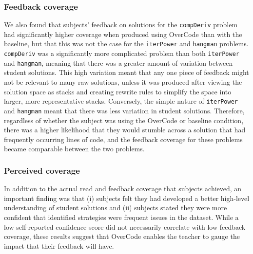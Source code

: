 \documentclass[12pt,twoside]{mitthesis}
\newcommand \codevar[1]{\texttt{#1}}
\providecommand{\DIFaddbegin}{} %
\providecommand{\DIFaddend}{} %
\providecommand{\DIFdelbegin}{} %
\providecommand{\DIFdelend}{} %
\begin{document}
{{{{{{{{{{\DIFdelbegin %
\DIFdelend \DIFaddbegin \subsubsection{Feedback coverage}
\DIFaddend We also found that subjects' feedback on solutions for the \codevar{compDeriv} problem had significantly higher coverage when produced using OverCode than with the baseline, but that this was not the case for the \codevar{iterPower} and \codevar{hangman} problems. \codevar{compDeriv} was a significantly more complicated problem than both \codevar{iterPower} and \codevar{hangman}, meaning that there was a greater amount of variation between student solutions. This high variation meant that any one piece of feedback might not be relevant to many raw solutions, unless it was produced after viewing the solution space as stacks and creating rewrite rules to simplify the space into larger, more representative stacks. Conversely, the simple nature of \codevar{iterPower} and \codevar{hangman} meant that there was less variation in student solutions. Therefore, regardless of whether the subject was using the OverCode or baseline condition, there was a higher likelihood that they would stumble across a solution that had frequently occurring lines of code, and the feedback coverage for these problems became comparable between the two problems.

\DIFdelbegin %
\DIFdelend \DIFaddbegin \subsubsection{Perceived coverage}
\DIFaddend In addition to the actual read and feedback coverage that subjects achieved, an important finding was that (i) subjects felt they had developed a better high-level understanding of student solutions and (ii) subjects stated they were more confident that identified strategies were frequent issues in the dataset. While a low self-reported confidence score did not necessarily correlate with low feedback coverage, these results suggest that OverCode enables the teacher to gauge the impact that their feedback will have.

}}}}}}}}}}
\end{document}
